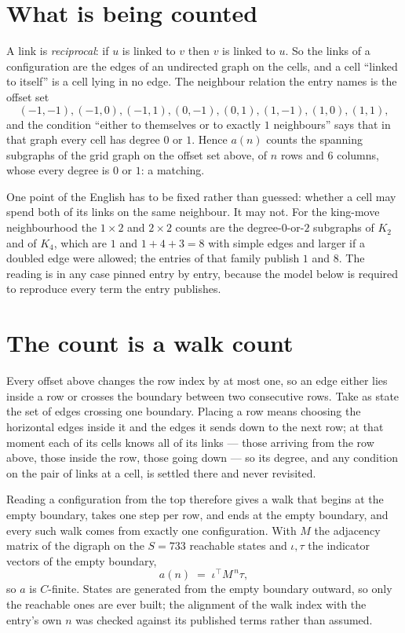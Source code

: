 \documentclass[11pt,a4paper]{article}
\theoremstyle{plain}
\theoremstyle{definition}
\begin{document}
\section{What is being counted}

A link is \emph{reciprocal}: if $u$ is linked to $v$ then $v$ is linked to $u$. So the links
of a configuration are the edges of an undirected graph on the cells, and a cell ``linked to
itself'' is a cell lying in no edge. The neighbour relation the entry names is the offset set
\[
(-1,-1), (-1,0), (-1,1), (0,-1), (0,1), (1,-1), (1,0), (1,1),
\]
and the condition ``either to themselves or to exactly $1$ neighbours'' says that in that
graph every cell has degree $0$ or $1$. Hence $a(n)$ counts the spanning subgraphs of the
grid graph on the offset set above, of $n$ rows and $6$ columns,
whose every degree is $0$ or $1$: a matching.

One point of the English has to be fixed rather than guessed: whether a cell may spend both of
its links on the same neighbour. It may not. For the king-move neighbourhood the $1\times2$
and $2\times2$ counts are the degree-$0$-or-$2$ subgraphs of $K_2$ and of $K_4$, which are $1$
and $1+4+3=8$ with simple edges and larger if a doubled edge were allowed; the entries of that
family publish $1$ and $8$. The reading is in any case pinned entry by entry, because the
model below is required to reproduce every term the entry publishes.


\section{The count is a walk count}

Every offset above changes the row index by at most one, so an edge either lies inside a row
or crosses the boundary between two consecutive rows. Take as state the set of edges crossing
one boundary. Placing a row means choosing the horizontal edges inside it and the edges it
sends down to the next row; at that moment each of its cells knows all of its links --- those
arriving from the row above, those inside the row, those going down --- so its degree, and any
condition on the pair of links at a cell, is settled there and never revisited.

Reading a configuration from the top therefore gives a walk that begins at the empty boundary,
takes one step per row, and ends at the empty boundary, and every such walk comes from exactly
one configuration. With $M$ the adjacency matrix of the digraph on the $S=733$ reachable
states and $\iota,\tau$ the indicator vectors of the empty boundary,
\[
a(n)\;=\;\iota^{\!\top}M^{\,n}\tau ,
\]
so $a$ is $C$-finite. States are generated from the empty boundary outward, so only the
reachable ones are ever built; the alignment of the walk index with the entry's own $n$ was
checked against its published terms rather than assumed.
\end{document}
